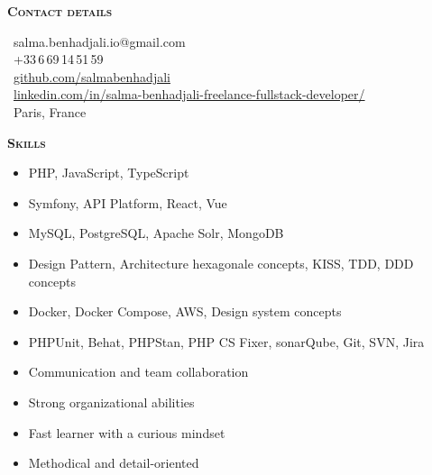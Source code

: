 \documentclass[11pt, a4paper]{article}
\newcommand{\headleft}[1]{\vspace*{3ex}\textsc{\textbf{#1}}\par%
    \vspace*{-1.5ex}\hrulefill\par\vspace*{0.7ex}}
\begin{document}
\setlength{\topskip}{0pt}
\setlength{\parindent}{0pt}
\setlength{\parskip}{0pt}
\setlength{\fboxsep}{0pt}
\pagestyle{empty}
\raggedbottom

\begin{minipage}[t]{0.345\textwidth} %

\vspace{-.2ex} %
\colorbox{cvblue}{\color{white}  %
\textwidth\relax%
\begin{minipage}[t][298mm][t]{0.82\textwidth}
\raggedright
\vspace*{6.5ex}

\begin{center}
\end{center}

\vspace*{1cm}

\headleft{Contact details}
\MVAt\ {\small salma.benhadjali.io@gmail.com} \\[0.3cm]
\Mobilefone\ +33\,6\,69\,14\,51\,59 \\[0.3cm]
\Mundus\ \href{https://github.com/salmabenhadjali}{github.com/salmabenhadjali} \\[0.3cm]
\Mundus\ \href{https://www.linkedin.com/in/salma-benhadjali-freelance-fullstack-developer/}
{linkedin.com/in/salma-benhadjali-freelance-fullstack-developer/} \\[0.3cm]
\Letter\ Paris, France
\normalsize

\vspace*{2cm}

\headleft{Skills}
\begin{itemize}
\item PHP, JavaScript, TypeScript
\item Symfony, API Platform, React, Vue
\item MySQL, PostgreSQL, Apache Solr, MongoDB
\item Design Pattern, Architecture hexagonale concepts, KISS, TDD, DDD concepts
\item Docker, Docker Compose, AWS, Design system concepts
\item PHPUnit, Behat, PHPStan, PHP CS Fixer, sonarQube, Git, SVN, Jira
\vspace*{0.5cm}
\item Communication and team collaboration
\item Strong organizational abilities
\item Fast learner with a curious mindset
\item Methodical and detail-oriented


\end{itemize}
\end{minipage}}
\end{minipage}
\end{document}
